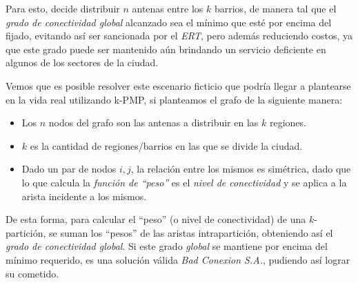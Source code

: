 Para esto, decide distribuir $n$ antenas entre los $k$ barrios, de manera tal que el \textit{grado de conectividad global} alcanzado sea el mínimo que esté por encima del fijado, evitando así ser sancionada por el \textit{ERT}, pero además reduciendo costos, ya que este grado puede ser mantenido aún brindando un servicio deficiente en algunos de los sectores de la ciudad.

Vemos que es posible resolver este escenario ficticio que podría llegar a plantearse en la vida real utilizando k-PMP, si planteamos el grafo de la siguiente manera:

\begin{itemize}
\item Los $n$ nodos del grafo son las antenas a distribuir en las $k$ regiones.

\item $k$ es la cantidad de regiones/barrios en las que se divide la ciudad.

\item Dado un par de nodos $i, j$, la relación entre los mismos es simétrica, dado que lo que calcula la \textit{función de ``peso''} es el \textit{nivel de conectividad} y se aplica a la arista incidente a los mismos.
\end{itemize}

De esta forma, para calcular el ``peso'' (o nivel de conectividad) de una $k$-partición, se suman los ``pesos'' de las aristas intrapartición, obteniendo así el \textit{grado de conectividad global}. Si este grado \textit{global} se mantiene por encima del mínimo requerido, es una solución válida \textit{Bad Conexion S.A.}, pudiendo así lograr su cometido.

